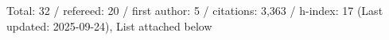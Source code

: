 Total: 32 / refereed: 20 / first author: 5 / citations: 3,363 / h-index: 17 (Last updated: 2025-09-24), List attached below